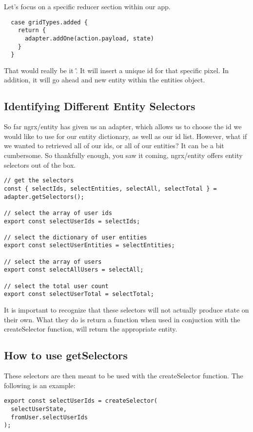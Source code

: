 Let's focus on a specific reducer section within our app.
\begin{verbatim}
  case gridTypes.added {
    return {
      adapter.addOne(action.payload, state)
    }
  }
\end{verbatim}

That would really be it \^. It will insert a unique id for that specific pixel.
In addition, it will go ahead and new entity within the entities object.

\subsection{ Identifying Different Entity Selectors }
So far ngrx/entity has given us an adapter, which allows us to choose the id
we would like to use for our entity dictionary, as well as our id list. However,
what if we wanted to retrieved all of our ids, or all of our entities? It can
be a bit cumbersome. So thankfully enough, you saw it coming, ngrx/entity
offers entity selectors out of the box.

\begin{lstlisting}
// get the selectors
const { selectIds, selectEntities, selectAll, selectTotal } = adapter.getSelectors();

// select the array of user ids
export const selectUserIds = selectIds;

// select the dictionary of user entities
export const selectUserEntities = selectEntities;

// select the array of users
export const selectAllUsers = selectAll;

// select the total user count
export const selectUserTotal = selectTotal;
\end{lstlisting}

It is important to recognize that these selectors will not actually produce
state on their own. What they do is return a function when used in
conjuction with the createSelector function, will return the appropriate
entity.

\subsection{ How to use getSelectors }
These selectors are then meant to be used with the createSelector function.
The following is an example:
\begin{verbatim}
export const selectUserIds = createSelector(
  selectUserState,
  fromUser.selectUserIds
);
\end{verbatim}

